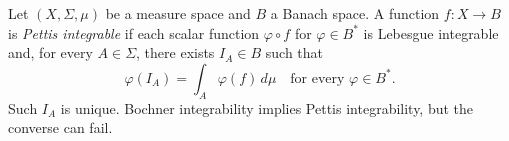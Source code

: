 
Let $(X,\Sigma,\mu)$ be a measure space and $B$ a Banach space. A function $f:X\to B$ is \emph{Pettis integrable} if each scalar function $\varphi\circ f$ for $\varphi\in B^*$ is Lebesgue integrable and, for every $A\in\Sigma$, there exists $I_A\in B$ such that
\[
\varphi(I_A)=\int_A\varphi(f)\,d\mu\quad\text{for every }\varphi\in B^*.
\]
Such $I_A$ is unique. Bochner integrability implies Pettis integrability, but the converse can fail.
